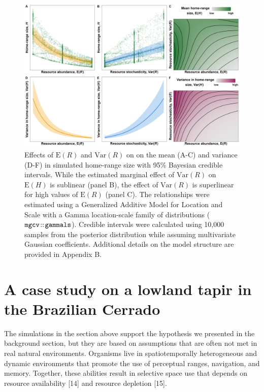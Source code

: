 \documentclass[
  12pt,
]{article}
\begin{document}
\begin{figure}

{\centering \includegraphics[width=1\linewidth]{../figures/simulation-regression-mean-and-var} 

}

\caption{Effects of $\text{E}(R)$ and $\text{Var}(R)$ on on the mean (A-C) and variance (D-F) in simulated home-range size with 95\% Bayesian credible intervals. While the estimated marginal effect of $\text{Var}(R)$ on $\text{E}(H)$ is sublinear (panel B), the effect of $\text{Var}(R)$ is superlinear for high values of $\text{E}(R)$ (panel C). The relationships were estimated using a Generalized Additive Model for Location and Scale with a Gamma location-scale family of distributions ($\tt{mgcv\!::\!gammals}$). Credible intervals were calculated using 10,000 samples from the posterior distribution while assuming multivariate Gaussian coefficients. Additional details on the model structure are provided in Appendix B.}\label{fig:5-5-reg}
\end{figure}

\section{A case study on a lowland tapir in the Brazilian Cerrado}\label{a-case-study-on-a-lowland-tapir-in-the-brazilian-cerrado}

\noindent The simulations in the section above support the hypothesis we presented in the background section, but they are based on assumptions that are often not met in real natural environments. Organisms live in spatiotemporally heterogeneous and dynamic environments that promote the use of perceptual ranges, navigation, and memory. Together, these abilities result in selective space use that depends on resource availability {[}14{]} and resource depletion {[}15{]}.
\end{document}
